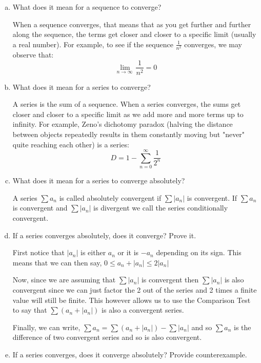 \documentclass{article}
\begin{document}
\begin{enumerate}[a.]
	\item What does it mean for a sequence to converge?

	When a sequence converges, that means that as you get further and further along the sequence, the terms get closer and closer to a specific limit (usually a real number). For example, to see if the sequence $\frac{1}{n^2}$ converges, we may observe that:
	\[\lim _{n \to \infty \:}\frac{1}{n^2}=0\]

	\item What does it mean for a series to converge?

    A series is the sum of a sequence. When a series converges, the sums get closer and closer to a specific limit as we add more and more terms up to infinity. For example, Zeno's dichotomy paradox (halving the distance between objects repeatedly results in them constantly moving but "never" quite reaching each other) is a series:
    \[D = 1 - \sum_{n=0}^{\infty}\frac{1}{2^n}\]

	\item What does it mean for a series to converge absolutely?

    A series $\sum a_n$ is called absolutely convergent if $\sum |a_n|$ is convergent. If $\sum a_n$ is convergent and $\sum |a_n|$ is divergent we call the series conditionally convergent.

	\item If a series converges absolutely, does it converge? Prove it.

    First notice that $|a_n|$ is either $a_n$ or it is $-a_n$ depending on its sign. This means that we can then say, $0 \leq a_n + |a_n| \leq 2|a_n|$

    Now, since we are assuming that $\sum |a_n| $ is convergent then $\sum |a_n| $ is also convergent since we can just factor the 2 out of the series and 2 times a finite value will still be finite. This however allows us to use the Comparison Test to say that $\sum(a_n + |a_n|)$ is also a convergent series.

    Finally, we can write, $\sum a_n = \sum(a_n + |a_n|) - \sum |a_n|$ and so $\sum a_n$ is the difference of two convergent series and so is also convergent.

	\item If a series converges, does it converge absolutely? Provide counterexample.


\end{enumerate}
\end{document}
